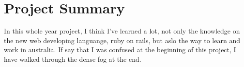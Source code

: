 \section*{Project Summary}
In this whole year project, I think I've learned a lot, not only the knowledge on the new web developing languange, ruby on rails, but aslo the way to learn and work in australia. If say that I was confused at the beginning of this project, I have walked through the dense fog at the end.
